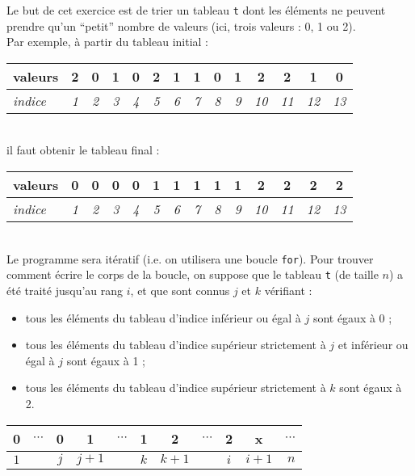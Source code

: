 Le but de cet exercice est de trier un tableau \texttt{t} dont les éléments ne
peuvent prendre qu'un ``petit'' nombre de valeurs (ici, trois valeurs : 0, 1 ou
2).\\
Par exemple, à partir du tableau initial :\\

\begin{tabular}{|l|c|c|c|c|c|c|c|c|c|c|c|c|c|}
 \hline
 valeurs&\bf 2&\bf 0&\bf 1&\bf 0&\bf 2&\bf 1&\bf 1&\bf 0&\bf 1&\bf
2&\bf 2&\bf 1&\bf 0\\ \hline
 \it indice&\it 1&\it 2&\it 3&\it 4&\it 5&\it 6&\it
7&\it 8&\it 9&\it 10&\it 11&\it 12&\it 13\\\hline
 \end{tabular}
 \\
 
il faut obtenir le tableau final :\\

\begin{tabular}{|l|c|c|c|c|c|c|c|c|c|c|c|c|c|}
 \hline
 valeurs&\bf 0&\bf 0&\bf 0&\bf 0&\bf 1&\bf 1&\bf 1&\bf 1&\bf 1&\bf
2&\bf 2&\bf 2&\bf 2\\ \hline
 \it indice&\it 1&\it 2&\it 3&\it 4&\it 5&\it 6&\it
7&\it 8&\it 9&\it 10&\it 11&\it 12&\it 13\\\hline
 \end{tabular}
 \\
 
 Le programme sera itératif (i.e. on utilisera une boucle \texttt{for}). Pour
trouver comment écrire le corps de la boucle, on suppose que le tableau
\texttt{t} (de taille $n$) a été traité jusqu'au rang $i$, et que sont connus
$j$ et $k$ vérifiant :\\
\begin{itemize}
 \item tous les éléments du tableau d'indice inférieur ou égal à $j$ sont égaux
à 0 ;
\item tous les éléments du tableau d'indice supérieur strictement à $j$
et inférieur ou égal à $j$ sont égaux à 1 ;
\item tous les éléments du tableau d'indice supérieur strictement à $k$
sont égaux à 2.\\
\end{itemize}

\begin{tabular}{|ccc|ccc|ccc|c|c|}
 \hline 0&$\cdots$&0& 1&$\cdots$&1& 2&$\cdots$&2&x&$\cdots$\\
 \hline \multicolumn{1}{c}{$1$}& \multicolumn{1}{c}{}& \multicolumn{1}{c}{$j$}&
\multicolumn{1}{c}{$j+1$}& \multicolumn{1}{c}{}& \multicolumn{1}{c}{$k$}&
\multicolumn{1}{c}{$k+1$}& \multicolumn{1}{c}{}& \multicolumn{1}{c}{$i$}&
\multicolumn{1}{c}{$i+1$}& \multicolumn{1}{r}{$n$}
\end{tabular}
\\

